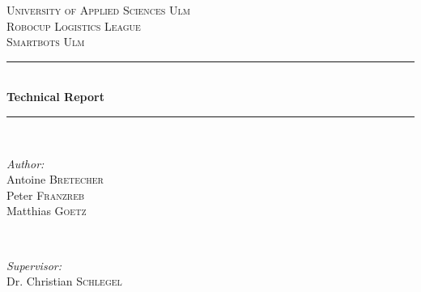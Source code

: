 \documentclass[12pt]{report}
\begin{document}
\begin{titlepage}

\newcommand{\HRule}{\rule{\linewidth}{0.5mm}} %

\center %
 

\textsc{\LARGE University of Applied Sciences Ulm}\\[1.5cm] %
\textsc{\Large Robocup Logistics League}\\[0.5cm] %
\textsc{\large Smartbots Ulm}\\[0.5cm] %


\HRule \\[0.4cm]
{ \huge \bfseries Technical Report}\\[0.4cm] %
\HRule \\[1.5cm]
 

\begin{minipage}{0.4\textwidth}
\begin{flushleft} \large
\emph{Author:}\\
Antoine \textsc{Bretecher} \\%
Peter \textsc{Franzreb} \\%
Matthias \textsc{Goetz} \\%
\end{flushleft}
\end{minipage}
~
\begin{minipage}{0.4\textwidth}
\begin{flushright} \large
\emph{Supervisor:} \\
Dr. Christian \textsc{Schlegel} %
\end{flushright}
\end{minipage}\\[2cm]


\end{titlepage}
\end{document}

